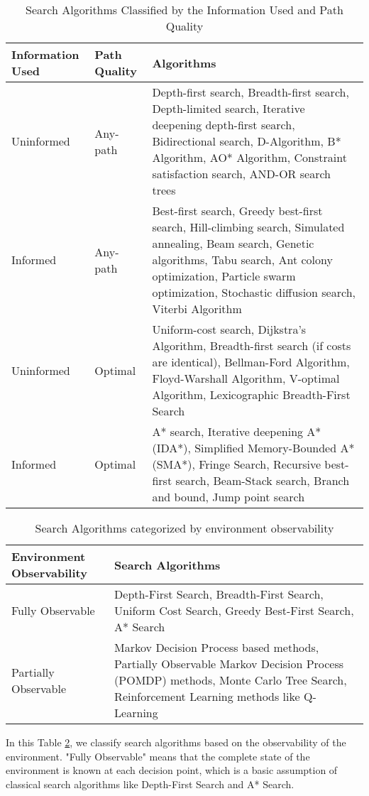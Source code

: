 \documentclass[a4paper,UKenglish,cleveref, autoref, thm-restate]{qlinhta}
\begin{document}
\begin{table}[h]
\centering
\begin{tabular}{|p{2cm}|p{3cm}|p{9.5cm}|}
\hline
\textbf{Information Used} & \textbf{Path Quality} & \textbf{Algorithms} \\
\hline
Uninformed & Any-path & Depth-first search, Breadth-first search, Depth-limited search, Iterative deepening depth-first search, Bidirectional search, D-Algorithm, B* Algorithm, AO* Algorithm, Constraint satisfaction search, AND-OR search trees \\
\hline
Informed & Any-path & Best-first search, Greedy best-first search, Hill-climbing search, Simulated annealing, Beam search, Genetic algorithms, Tabu search, Ant colony optimization, Particle swarm optimization, Stochastic diffusion search, Viterbi Algorithm \\
\hline
Uninformed & Optimal & Uniform-cost search, Dijkstra's Algorithm, Breadth-first search (if costs are identical), Bellman-Ford Algorithm, Floyd-Warshall Algorithm, V-optimal Algorithm, Lexicographic Breadth-First Search \\
\hline
Informed & Optimal & A* search, Iterative deepening A* (IDA*), Simplified Memory-Bounded A* (SMA*), Fringe Search, Recursive best-first search, Beam-Stack search, Branch and bound, Jump point search \\
\hline
\end{tabular}
\caption{Search Algorithms Classified by the Information Used and Path Quality}
\label{tab:search_algorithms_extended}
\end{table}


\begin{table}[h]
\centering
\begin{tabular}{|l|p{10cm}|}
\hline
\textbf{Environment Observability} & \textbf{Search Algorithms} \\
\hline
Fully Observable & Depth-First Search, Breadth-First Search, Uniform Cost Search, Greedy Best-First Search, A* Search \\
\hline
Partially Observable & Markov Decision Process based methods, Partially Observable Markov Decision Process (POMDP) methods, Monte Carlo Tree Search, Reinforcement Learning methods like Q-Learning \\
\hline
\end{tabular}
\caption{Search Algorithms categorized by environment observability}
\label{tab:observable_search}
\end{table}

In this Table \ref{tab:observable_search}, we classify search algorithms based on the observability of the environment. "Fully Observable" means that the complete state of the environment is known at each decision point, which is a basic assumption of classical search algorithms like Depth-First Search and A* Search.\\
\end{document}
